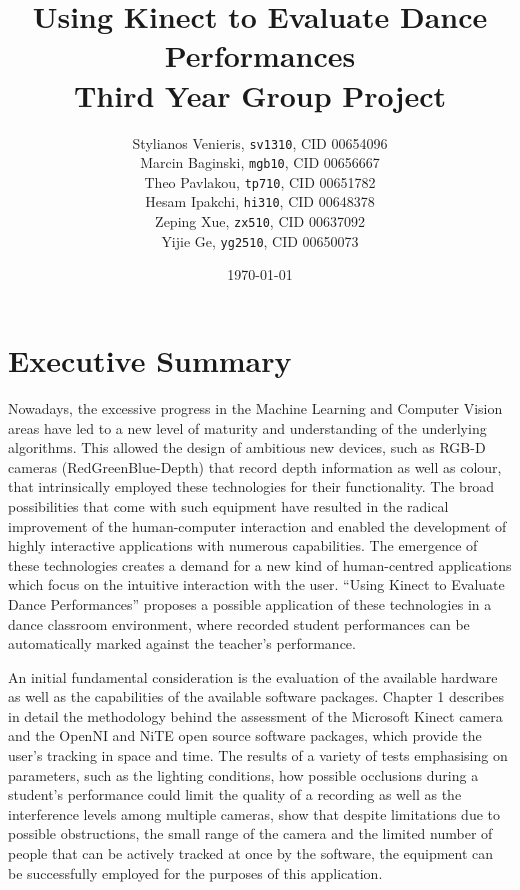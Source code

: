 \documentclass[11pt,a4paper]{article}
\begin{document}
\title{Using Kinect to Evaluate Dance Performances\\ Third Year Group Project}
\author{Stylianos Venieris, \texttt{sv1310}, CID 00654096\\
Marcin Baginski, \texttt{mgb10}, CID 00656667\\
Theo Pavlakou, \texttt{tp710}, CID 00651782\\
Hesam Ipakchi, \texttt{hi310}, CID 00648378\\
Zeping Xue, \texttt{zx510}, CID 00637092\\
Yijie Ge, \texttt{yg2510}, CID 00650073 }
\date{\today}
\maketitle
{}
\newpage


\section*{\center Executive Summary}
Nowadays, the excessive progress in the Machine Learning and Computer Vision areas have led to a new level of maturity and understanding of the underlying algorithms. This allowed the design of ambitious new devices, such as RGB-D cameras (RedGreenBlue-Depth) that record depth information as well as colour, that intrinsically employed these technologies for their functionality. The broad possibilities that come with such equipment have resulted in the radical improvement of the human-computer interaction and enabled the development of highly interactive applications with numerous capabilities. The emergence of these technologies creates a demand for a new kind of human-centred applications which focus on the intuitive interaction with the user. “Using Kinect to Evaluate Dance Performances” proposes a possible application of these technologies in a dance classroom environment, where recorded student performances can be automatically marked against the teacher’s performance.

\noindent
An initial fundamental consideration is the evaluation of the available hardware as well as the capabilities of the available software packages. Chapter 1 describes in detail the methodology behind the assessment of the Microsoft Kinect camera and the OpenNI and NiTE open source software packages, which provide the user’s tracking in space and time. The results of a variety of tests emphasising on parameters, such as the lighting conditions, how possible occlusions during a student’s performance could limit the quality of a recording as well as the interference levels among multiple cameras, show that despite limitations due to possible obstructions, the small range of the camera and the limited number of people that can be actively tracked at once by the software, the equipment can be successfully employed for the purposes of this application.
\end{document}
